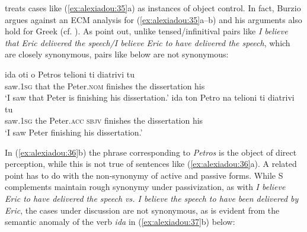 \documentclass[output=paper]{langsci/langscibook}
\begin{document}
\citet{Iatridou1993} treats cases like (\ref{ex:alexiadou:35}a) as instances of object control. In fact, Burzio argues against an ECM analysis for (\ref{ex:alexiadou:35}a--b) and his arguments also hold for Greek (cf. \citealt[287--290]{Burzio1986}). As \citet{Alexiadou1997} point out, unlike tensed\slash infinitival pairs like \textit{I believe that Eric delivered the speech\slash I believe Eric to have delivered the speech}, which are closely synonymous, pairs like  below are not synonymous:

\ea%
    \label{ex:alexiadou:36}
    \ea
    \gll ida          oti   o    Petros         telioni   ti      diatrivi       tu\\
             saw{}.\textsc{1sg}  that  the Peter{}.\textsc{nom}   finishes  the  dissertation his\\
    \glt     ‘I saw that Peter is finishing his dissertation.’
    \ex
    \gll ida          ton  Petro      na     telioni   ti    diatrivi        tu\\
             saw{}.\textsc{1sg}  the  Peter{}.\textsc{acc} \textsc{sbjv} finishes the  dissertation his\\
    \glt     ‘I saw Peter finishing his dissertation.’
    \z
\z

In (\ref{ex:alexiadou:36}b) the phrase corresponding to \textit{Petros} is the object of direct perception, while this is not true of sentences like (\ref{ex:alexiadou:36}a). A related point has to do with the non-synonymy of active and passive forms. While S complements maintain rough synonymy under passivization, as with \textit{I believe Eric to have delivered the speech vs. I believe the speech to have been delivered by Eric}, the cases under discussion are not synonymous, as is evident from the semantic anomaly of the verb \textit{ida} in (\ref{ex:alexiadou:37}b) below:

\ea%
    \label{ex:alexiadou:37}
    \z
\z
    
\end{document}

